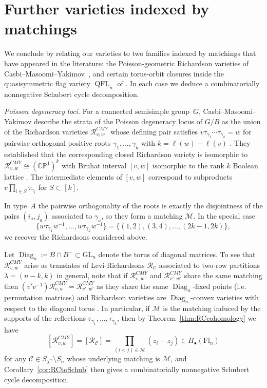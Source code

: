 \documentclass[11pt]{amsart}
\theoremstyle{definition}
\numberwithin{equation}{section}
\newcommand{\fl}[1]{\mathrm{Fl}_{#1}}
\newcommand{\GL}{\mathrm{GL}}
\begin{document}
\section{Further varieties indexed by matchings}
\label{sec:FurtherMatchings}

We conclude by relating our varieties to two families indexed by matchings that have appeared in the literature: the Poisson-geometric Richardson varieties of Casbi--Masoomi--Yakimov~\cite{CMY}, and certain torus-orbit closures inside the quasisymmetric flag variety $\operatorname{QFL}_n$ of \cite{BGNST2}. In each case we deduce a combinatorially nonnegative Schubert cycle decomposition.

\smallskip
\noindent\textit{Poisson degeneracy loci.}
For a connected semisimple group~$G$, Casbi--Masoomi--Yakimov \cite{CMY} describe the strata of the
Poisson degeneracy locus of $G/B$ as the union of the Richardson varieties $\mathcal{R}_{v,w}^{CMY}$ whose
defining pair satisfies $v\tau_{\gamma_1}\cdots \tau_{\gamma_k} = w$ for pairwise orthogonal
positive roots $\gamma_1,\dots,\gamma_k$ with $k=\ell(w)-\ell(v)$
\cite[Thm.~A]{CMY}.
They established that the corresponding closed Richardson variety
is isomorphic to
$\mathcal{R}_{v,w}^{CMY}\cong(\mathbb{CP}^1)^k$ with Bruhat interval $[v,w]$ isomorphic
to the rank $k$ Boolean lattice \cite[Thm.~B]{CMY}.
The intermediate elements of $[v,w]$ correspond to subproducts $v\prod_{i\in S}\tau_{\gamma_i}$ for $S\subset [k]$.

In type~$A$ the
pairwise orthogonality of the roots is exactly the disjointness of the pairs
$(i_a,j_a)$ associated to $\gamma_a$, so they form a matching $\mathcal{M}$. In the special case $$\{w\tau_{\gamma_1}w^{-1},\ldots,w\tau_{\gamma_k}w^{-1}\}=\{(1,2),(3,4),\ldots,(2k-1,2k)\},$$ we recover the Richardsons considered above.

Let $\operatorname{Diag}_n\coloneqq B\cap B^-\subset \GL_n$ denote the torus of diagonal matrices. To see that $\mathcal{R}_{v,w}^{CMY}$ arise as translates of Levi-Richardsons $\mathcal{R}_\mathcal{C}$ associated to two-row partitions $\lambda=(n-k,k)$ in general, note that if $\mathcal{R}_{v,w}^{CMY}$ and $\mathcal{R}_{v',w'}^{CMY}$ share the same matching then $(v'v^{-1})\mathcal{R}_{v,w}^{CMY}=\mathcal{R}_{v',w'}^{CMY}$ as they share the same $\operatorname{Diag}_n$-fixed points (i.e. permutation matrices) and Richardson varieties are $\operatorname{Diag}_n$-convex varieties with respect to the diagonal  torus \cite[Theorem 6.3]{BCP25}. In particular, if $\mathcal{M}$ is the matching induced by the supports of the reflections $\tau_{\gamma_1},\ldots,\tau_{\gamma_k}$, then by Theorem~\ref{thm:RCcohomology} we have
$$[\mathcal{R}_{v,w}^{CMY}]=[\mathcal{R}_{\mathcal{C}}]=\prod_{(i<j)\in \mathcal{M}}(z_i-z_j)\in H_\bullet(\fl{n})$$
for any $\mathcal{C}\in S_{\lambda^{\top}}\setminus S_n$ whose underlying matching is $\mathcal{M}$, and Corollary~\ref{cor:RCtoSchub} then gives a combinatorially nonnegative Schubert cycle decomposition.
\end{document}
